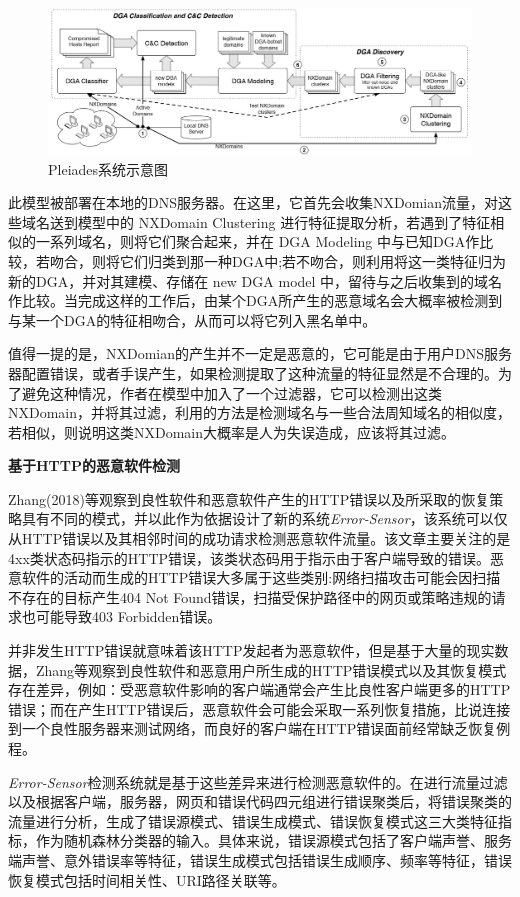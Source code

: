 \documentclass[12pt]{article} %
\begin{document}
\begin{figure}
	\caption{Pleiades系统示意图}
	\label{dga_pic}
	\includegraphics[width = \linewidth]{./pics/dga}
\end{figure}

此模型被部署在本地的DNS服务器。在这里，它首先会收集NXDomian流量，对这些域名送到模型中的 NXDomain Clustering 进行特征提取分析，若遇到了特征相似的一系列域名，则将它们聚合起来，并在 DGA Modeling 中与已知DGA作比较，若吻合，则将它们归类到那一种DGA中;若不吻合，则利用将这一类特征归为新的DGA，并对其建模、存储在 new DGA model 中，留待与之后收集到的域名作比较。当完成这样的工作后，由某个DGA所产生的恶意域名会大概率被检测到与某一个DGA的特征相吻合，从而可以将它列入黑名单中。

值得一提的是，NXDomian的产生并不一定是恶意的，它可能是由于用户DNS服务器配置错误，或者手误产生，如果检测提取了这种流量的特征显然是不合理的。为了避免这种情况，作者在模型中加入了一个过滤器，它可以检测出这类NXDomain，并将其过滤，利用的方法是检测域名与一些合法周知域名的相似度，若相似，则说明这类NXDomain大概率是人为失误造成，应该将其过滤。

\textbf{基于HTTP的恶意软件检测}

Zhang(2018)\cite{Zhang}等观察到良性软件和恶意软件产生的HTTP错误以及所采取的恢复策略具有不同的模式，并以此作为依据设计了新的系统\emph{Error-Sensor}，该系统可以仅从HTTP错误以及其相邻时间的成功请求检测恶意软件流量。该文章主要关注的是4xx类状态码指示的HTTP错误，该类状态码用于指示由于客户端导致的错误。恶意软件的活动而生成的HTTP错误大多属于这些类别:网络扫描攻击可能会因扫描不存在的目标产生404 Not Found错误，扫描受保护路径中的网页或策略违规的请求也可能导致403 Forbidden错误。

并非发生HTTP错误就意味着该HTTP发起者为恶意软件，但是基于大量的现实数据，Zhang等观察到良性软件和恶意用户所生成的HTTP错误模式以及其恢复模式存在差异，例如：受恶意软件影响的客户端通常会产生比良性客户端更多的HTTP错误；而在产生HTTP错误后，恶意软件会可能会采取一系列恢复措施，比说连接到一个良性服务器来测试网络，而良好的客户端在HTTP错误面前经常缺乏恢复例程。

\emph{Error-Sensor}检测系统就是基于这些差异来进行检测恶意软件的。在进行流量过滤以及根据客户端，服务器，网页和错误代码四元组进行错误聚类后，将错误聚类的流量进行分析，生成了错误源模式、错误生成模式、错误恢复模式这三大类特征指标，作为随机森林分类器的输入。具体来说，错误源模式包括了客户端声誉、服务端声誉、意外错误率等特征，错误生成模式包括错误生成顺序、频率等特征，错误恢复模式包括时间相关性、URI路径关联等。
\end{document}
